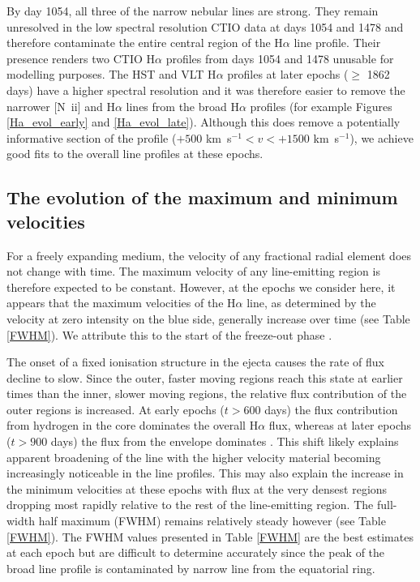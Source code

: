 \documentclass[useAMS,usenatbib,usegraphicx]{mnras}
\begin{document}
 
 By day 1054, all three of the narrow nebular lines are strong.  They remain unresolved in the low spectral resolution CTIO data at days 1054 and 1478 and therefore contaminate the entire central region of the H$\alpha$ line profile.  Their presence renders two CTIO H$\alpha$ profiles from days 1054 and 1478 unusable for modelling purposes.  The HST and VLT H$\alpha$ profiles at later epochs ($\ge$ 1862 days) have a higher spectral resolution and it was therefore easier to remove the narrower [N~{\sc ii}] and H$\alpha$ lines from the broad H$\alpha$ profiles (for example Figures \ref{Ha_evol_early} and \ref{Ha_evol_late}). Although this does remove a 
 potentially informative section of the profile ($+500$ km~s$^{-1}<v<+1500$ km~s$^{-1}$), we achieve good fits 
to the overall line profiles at these epochs.



\subsection{The evolution of the maximum and minimum velocities}

For a freely expanding medium, the velocity of any fractional radial element does not change with time.  The maximum velocity of any line-emitting region is therefore expected to be constant.  However, at the epochs we consider here, it appears that the maximum velocities of the H$\alpha$ line, as determined by the velocity at zero intensity on the blue side, generally increase over time (see Table \ref{FWHM}).  We attribute this to the start of the freeze-out phase \citep{Danziger1991,Fransson1993}.  

The onset of a fixed ionisation structure in the ejecta causes the rate of flux decline to slow.  Since the outer, faster moving regions reach this state at earlier times than the inner, slower moving regions, the relative flux contribution of the outer regions is increased.  At early epochs ($t>600$ days) the flux contribution from hydrogen in the core dominates the overall H$\alpha$ flux, whereas at later epochs ($t > 900$ days) the flux from the envelope dominates \citep{Fransson1993}.  This shift likely explains apparent broadening of the line with the higher velocity material becoming increasingly noticeable in the line profiles.  This may also explain the increase in the minimum velocities at these epochs with flux at the very densest regions dropping most rapidly relative to the rest of the line-emitting region. 
The full-width half maximum (FWHM) remains relatively steady however (see Table \ref{FWHM}).  The FWHM values presented in Table \ref{FWHM} are the best estimates at each epoch but are difficult to determine accurately since the peak of the broad line profile is contaminated by narrow line from the equatorial ring.   
\end{document}
